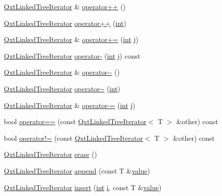 \begin{DoxyCompactItemize}
\item 
\hyperlink{class_qxt_linked_tree_iterator}{Qxt\-Linked\-Tree\-Iterator} \& \hyperlink{class_qxt_linked_tree_iterator_aebebd391d2714645b50360d43f4f0577}{operator++} ()
\item 
\hyperlink{class_qxt_linked_tree_iterator}{Qxt\-Linked\-Tree\-Iterator} \hyperlink{class_qxt_linked_tree_iterator_a474cb59bd3067d19dfde18fff7ef40b2}{operator++} (\hyperlink{ioapi_8h_a787fa3cf048117ba7123753c1e74fcd6}{int})
\item 
\hyperlink{class_qxt_linked_tree_iterator}{Qxt\-Linked\-Tree\-Iterator} \& \hyperlink{class_qxt_linked_tree_iterator_af62b6bfbd4b068ef39baf2b5432797d9}{operator+=} (\hyperlink{ioapi_8h_a787fa3cf048117ba7123753c1e74fcd6}{int} j)
\item 
\hyperlink{class_qxt_linked_tree_iterator}{Qxt\-Linked\-Tree\-Iterator} \hyperlink{class_qxt_linked_tree_iterator_a439e807a61a1c40d93d4b765ad58c57f}{operator-\/} (\hyperlink{ioapi_8h_a787fa3cf048117ba7123753c1e74fcd6}{int} j) const 
\item 
\hyperlink{class_qxt_linked_tree_iterator}{Qxt\-Linked\-Tree\-Iterator} \& \hyperlink{class_qxt_linked_tree_iterator_a2be835e96c873514d343d8a5ef39749e}{operator-\/-\/} ()
\item 
\hyperlink{class_qxt_linked_tree_iterator}{Qxt\-Linked\-Tree\-Iterator} \hyperlink{class_qxt_linked_tree_iterator_a3352f2a6c3c4045712009651ad6f7865}{operator-\/-\/} (\hyperlink{ioapi_8h_a787fa3cf048117ba7123753c1e74fcd6}{int})
\item 
\hyperlink{class_qxt_linked_tree_iterator}{Qxt\-Linked\-Tree\-Iterator} \& \hyperlink{class_qxt_linked_tree_iterator_a7743887784eed99509cd3cc2635e390e}{operator-\/=} (\hyperlink{ioapi_8h_a787fa3cf048117ba7123753c1e74fcd6}{int} j)
\item 
bool \hyperlink{class_qxt_linked_tree_iterator_a6322e988227a45aa4ba12deb16b7354e}{operator==} (const \hyperlink{class_qxt_linked_tree_iterator}{Qxt\-Linked\-Tree\-Iterator}$<$ T $>$ \&other) const 
\item 
bool \hyperlink{class_qxt_linked_tree_iterator_a0563422b418e3b488718ef7c5ae2460d}{operator!=} (const \hyperlink{class_qxt_linked_tree_iterator}{Qxt\-Linked\-Tree\-Iterator}$<$ T $>$ \&other) const 
\item 
\hyperlink{class_qxt_linked_tree_iterator}{Qxt\-Linked\-Tree\-Iterator} \hyperlink{class_qxt_linked_tree_iterator_a68a8cbb554637dc68f0d45f699bb76d0}{erase} ()
\item 
\hyperlink{class_qxt_linked_tree_iterator}{Qxt\-Linked\-Tree\-Iterator} \hyperlink{class_qxt_linked_tree_iterator_a22a373e968f0d2d8d6c9632a8760ddea}{append} (const T \&\hyperlink{glext_8h_aa0e2e9cea7f208d28acda0480144beb0}{value})
\item 
\hyperlink{class_qxt_linked_tree_iterator}{Qxt\-Linked\-Tree\-Iterator} \hyperlink{class_qxt_linked_tree_iterator_a6e0bd91a0420c0fc9e98af5aef4958e1}{insert} (\hyperlink{ioapi_8h_a787fa3cf048117ba7123753c1e74fcd6}{int} \hyperlink{uavobjecttemplate_8m_a6f6ccfcf58b31cb6412107d9d5281426}{i}, const T \&\hyperlink{glext_8h_aa0e2e9cea7f208d28acda0480144beb0}{value})
\end{DoxyCompactItemize}
